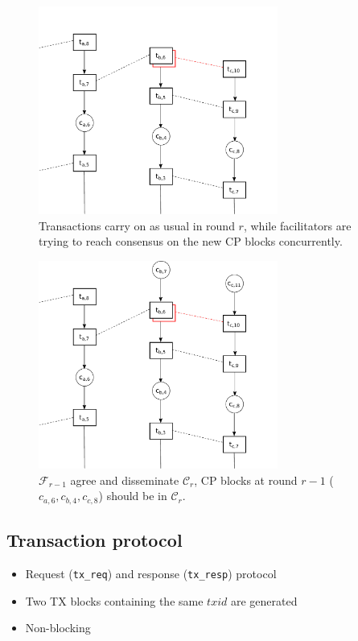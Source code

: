 \documentclass{beamer}
\newcommand{\C}{\mathcal{C}}
\newcommand{\F}{\mathcal{F}}
\begin{document}
\begin{frame}{\subsecname}
  \begin{figure}[h]
  \includegraphics[width=0.7\textwidth]{trustchain-3}
  \centering
  \caption{Transactions carry on as usual in round $r$,
  while facilitators are trying to reach consensus on the new CP blocks concurrently.}
  \end{figure}
\end{frame}

\begin{frame}{\subsecname}
  \begin{figure}[h]
  \includegraphics[width=0.7\textwidth]{trustchain-4}
  \centering
  \caption{$\F_{r-1}$ agree and disseminate $\C_r$,
  CP blocks at round $r-1$ ($c_{a, 6}, c_{b, 4}, c_{c,8}$) should be in $\C_r$.}
  \end{figure}
\end{frame}

\subsection{Transaction protocol}
\begin{frame}{\subsecname}
\begin{itemize}
\item Request (\texttt{tx\_req}) and response (\texttt{tx\_resp}) protocol
\item Two TX blocks containing the same $txid$ are generated
\item Non-blocking
\end{itemize}
\end{frame}
\end{document}
